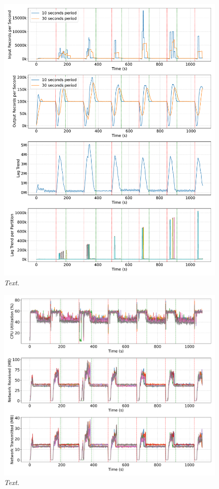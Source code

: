 \begin{figure}[ht]
    \centering
    \includegraphics[width=1\textwidth]{figures/flink-2pods/flink_2_pods_plot_impact}
    \caption{\textit{Text.}}
    \label{fig:flink-2pods-impact}
\end{figure}


\begin{figure}[ht]
    \centering
    \includegraphics[width=1\textwidth]{figures/flink-2pods/flink_2_pods_resources}
    \caption{\textit{Text.}}
    \label{fig:flink-2pods-resource}
\end{figure}


